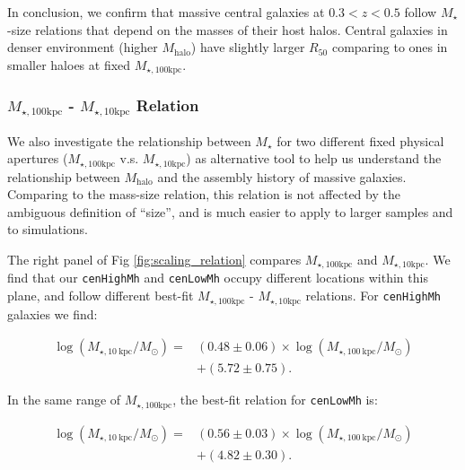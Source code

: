 \documentclass[a4paper,fleqn,usenatbib]{mnras}
\def\rbcg{\texttt{cenHighMh}}
\def\nbcg{\texttt{cenLowMh}}
\def\mstar{{$M_{\star}$}}
\def\mhalo{{$M_{\mathrm{halo}}$}}
\def\minn{{$M_{\star,10\mathrm{kpc}}$}}
\def\mtot{{$M_{\star,100\mathrm{kpc}}$}}
\begin{document}
    In conclusion, we confirm that massive central galaxies at $0.3 < z < 0.5$
    follow \mstar{}-size relations that depend on the masses of their host halos. 
    Central galaxies in denser environment (higher \mhalo{}) have slightly 
    larger $R_{\mathrm{50}}$ comparing to ones in smaller haloes at fixed 
    \mtot{}. 
    
\subsubsection{\mtot{} - \minn{} Relation}
    \label{sssec:m100_m10}
    
    We also investigate the relationship between \mstar{} for two different
    fixed physical apertures (\mtot{} v.s. \minn{}) as alternative tool to help us 
    understand the relationship between \mhalo{} and the assembly history of massive
    galaxies.   
    Comparing to the mass-size relation, this relation is not affected by the 
    ambiguous definition of ``size'', and is much easier to apply to larger samples 
    and to simulations. 
    
    The right panel of Fig \ref{fig:scaling_relation} compares \mtot{} and \minn{}. 
    We find that our \rbcg{} and \nbcg{} occupy different locations within this plane,
    and follow different best-fit \mtot{} - \minn{} relations. 
    For \rbcg{} galaxies we find:
    
    \begin{equation}
        \begin{aligned}
        \log (M_{\star, 10\ \mathrm{kpc}}/M_{\odot}) = & (0.48\pm0.06) \times \log (M_{\star, 100\ \mathrm{kpc}}/M_{\odot}) \\ & +(5.72\pm0.75).
        \end{aligned}
    \end{equation}
    
    \noindent In the same range of \mtot{}, the best-fit relation for \nbcg{} is:
     
    \begin{equation}
        \begin{aligned}
        \log (M_{\star, 10\ \mathrm{kpc}}/M_{\odot}) = & (0.56\pm0.03) \times \log (M_{\star, 100\ \mathrm{kpc}}/M_{\odot}) \\ & +(4.82\pm0.30).
        \end{aligned}
    \end{equation}
    
\end{document}
